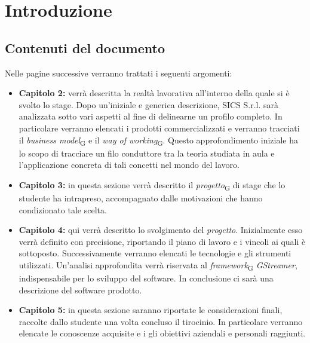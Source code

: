 
\hypertarget{Introduzione}{%
	\chapter{Introduzione}\label{header-n3}}

\hypertarget{Contenuti del documento}{%
	\section{Contenuti del documento}\label{header-n4}}

Nelle pagine successive verranno trattati i seguenti argomenti:
\cite{7942676}
\begin{itemize}
	\item
	\textbf{Capitolo 2:} verrà descritta la realtà lavorativa all'interno
	della quale si è svolto lo stage. Dopo un'iniziale e generica
	descrizione, SICS S.r.l. sarà analizzata sotto vari aspetti al fine di
	delinearne un profilo completo. In particolare verranno elencati i
	prodotti commercializzati e verranno tracciati il \emph{business
		model}\textsubscript{G} e il \emph{way of working}\textsubscript{G}.
	Questo approfondimento iniziale ha lo scopo di tracciare un filo
	conduttore tra la teoria studiata in aula e l'applicazione concreta di tali concetti nel mondo del lavoro.
	\item
	\textbf{Capitolo 3:} in questa sezione verrà descritto il
	\emph{progetto}\textsubscript{G} di stage che lo studente ha
	intrapreso, accompagnato dalle motivazioni che hanno condizionato tale
	scelta.
	\item
	\textbf{Capitolo 4:} qui verrà descritto lo svolgimento del
	\emph{progetto}. Inizialmente esso verrà definito con precisione,
	riportando il piano di lavoro e i vincoli ai quali è
	sottoposto. Successivamente verranno elencati le tecnologie e gli strumenti utilizzati. Un'analisi
	approfondita verrà riservata al \emph{framework}\textsubscript{G}
	\emph{GStreamer}, indispensabile per lo sviluppo del software. In
	conclusione ci sarà una descrizione del software prodotto.
	\item
	\textbf{Capitolo 5:} in questa sezione saranno riportate le
	considerazioni finali, raccolte dallo studente una volta concluso il
	tirocinio. In particolare verranno elencate le conoscenze acquisite e i
	gli obiettivi aziendali e personali raggiunti.
\end{itemize}


